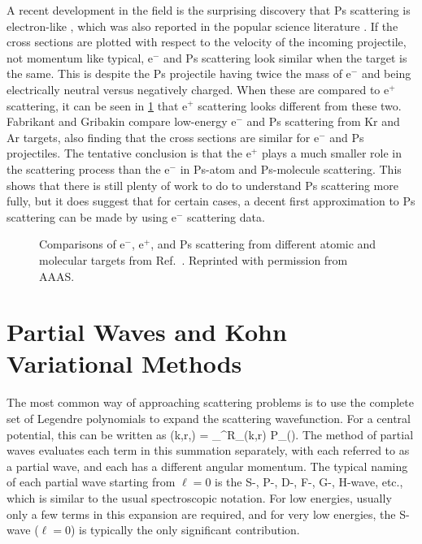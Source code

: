 \documentclass[Dissertation.tex]{subfiles}
\begin{document}
A recent development in the field is the surprising discovery that Ps 
scattering is electron-like \cite{Brawley2010,Brawley2010a}, which was also reported in the
popular science literature \cite{NewScientist2015}. If the cross sections are 
plotted with respect to the velocity of the incoming projectile, not momentum 
like typical, e$^-$ and Ps scattering look similar when the target is the same.
This is despite the Ps projectile having twice the mass of e$^-$ and being 
electrically neutral versus negatively charged. When these are compared to
e$^+$ scattering, it can be seen in \cref{fig:ScienceBrawley} that e$^+$
scattering looks different from these two. Fabrikant and Gribakin
\cite{Fabrikant2014,Fabrikant2014a} compare low-energy e$^-$ and Ps scattering
from Kr and Ar targets, also finding that the cross sections are similar for
e$^-$ and Ps projectiles. The tentative conclusion is that the
e$^+$ plays a much smaller role in the scattering process than the e$^-$
in Ps-atom and Ps-molecule scattering. This shows that there is still
plenty of work to do to understand Ps scattering more fully, but it
does suggest that for certain cases, a decent first approximation to Ps
scattering can be made by using e$^-$ scattering data.

\begin{figure}[H]
	\centering
	\caption[Comparisons of e$^-$, e$^+$, and Ps scattering]{Comparisons of
e$^-$, e$^+$, and Ps scattering from different atomic and molecular targets 
from Ref.~\cite{Brawley2010a}. Reprinted with permission from AAAS.}
	\label{fig:ScienceBrawley}
\end{figure}


\section{Partial Waves and Kohn Variational Methods}
\label{sec:KohnIntro}

The most common way of approaching scattering problems is to use the complete
set of Legendre polynomials to expand the scattering wavefunction. For a
central potential, this can be written as \cite{Bransden2003}
\beq
\label{eq:PartialWave}
\Psi(k,r,\theta) = \sum_{}^\infty R_\ell(k,r) P_\ell(\cos\theta).
\eeq
The method of partial waves evaluates each term in this summation separately,
with each referred to as a partial wave, and each has a different angular 
momentum. The typical naming of each partial wave starting from $\ell = 0$
is the S-, P-, D-, F-, G-, H-wave, etc., which is similar to the usual 
spectroscopic notation. For low energies, usually only a few terms in this
expansion are required, and for very low energies, the S-wave ($\ell = 0$) is 
typically the only significant contribution.
\end{document}
